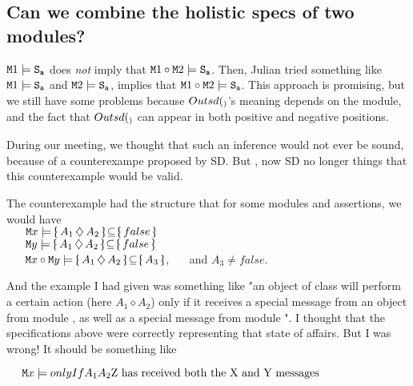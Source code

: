  
\subsection{Can we combine the holistic specs of two modules?}

 
${\texttt{M}}{1}  \models {\texttt{S}}_{{\texttt{a}}}$ does \emph{not} imply that  ${\texttt{M}}{1}\circ{\texttt{M}}{2}  \models {\texttt{S}}_{{\texttt{a}}}$. 
Then, Julian tried something like ${\texttt{M}}{1}  \models {\texttt{S}}_{{\texttt{a}}}$  and ${\texttt{M}}{2}  \models {\texttt{S}}_{{\texttt{a}}}$, implies that
${\texttt{M}}{1}\circ{\texttt{M}}{2}  \models {\texttt{S}}_{{\texttt{a}}}$. This approach is promising, but we still have some problems because   $Outsd(_)$'s meaning depends on the module,  and the fact that   $Outsd(_)$ can appear in both positive and negative positions. 

During our meeting, we thought that such an inference would not ever be sound, because of a counterexampe proposed
by SD. But \SP, now SD no longer things that this counterexample would be valid. 

The counterexample had the structure that for some modules and assertions, we would have
\\
$~ \ \ \ \ \Mod{x} \models \onlyIf{A_1}{A_2}{false}$
\\
$~ \ \ \ \ \Mod{y} \models \onlyIf{A_1}{A_2}{false}$
\\
$~ \ \ \ \ \Mod{x}\circ \Mod{y} \models \onlyIf{A_1}{A_2}{A_3}$,  \ \ \ and $A_3\neq false$.


And the example I had given was something like "an object of class  will 
perform a certain action (here $A_1 \diamond A_2$)
only if it receives a special message from an object from module , as well as a special message from module ".
I thought that the specifications above were correctly representing that state of affairs. But I was wrong! 
It should be something like

$\ \ \ \ {\texttt{M}}{x} \models onlyIf{A_1}{A_2}{\mbox{Z has received both the X and Y messages}}$

 
 
